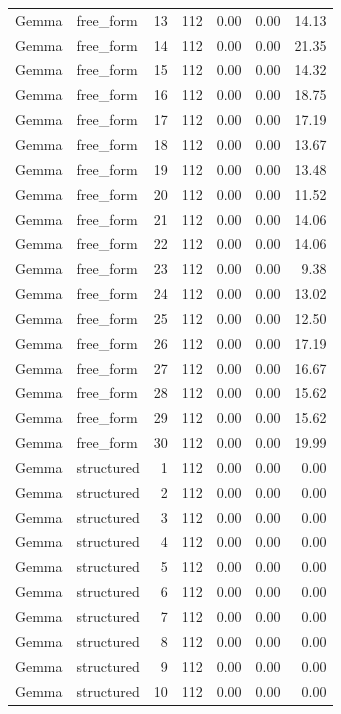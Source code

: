 \begin{longtable}{llrrrrr}
Gemma & free\_form & 13 & 112 & 0.00 & 0.00 & 14.13 \\
Gemma & free\_form & 14 & 112 & 0.00 & 0.00 & 21.35 \\
Gemma & free\_form & 15 & 112 & 0.00 & 0.00 & 14.32 \\
Gemma & free\_form & 16 & 112 & 0.00 & 0.00 & 18.75 \\
Gemma & free\_form & 17 & 112 & 0.00 & 0.00 & 17.19 \\
Gemma & free\_form & 18 & 112 & 0.00 & 0.00 & 13.67 \\
Gemma & free\_form & 19 & 112 & 0.00 & 0.00 & 13.48 \\
Gemma & free\_form & 20 & 112 & 0.00 & 0.00 & 11.52 \\
Gemma & free\_form & 21 & 112 & 0.00 & 0.00 & 14.06 \\
Gemma & free\_form & 22 & 112 & 0.00 & 0.00 & 14.06 \\
Gemma & free\_form & 23 & 112 & 0.00 & 0.00 & 9.38 \\
Gemma & free\_form & 24 & 112 & 0.00 & 0.00 & 13.02 \\
Gemma & free\_form & 25 & 112 & 0.00 & 0.00 & 12.50 \\
Gemma & free\_form & 26 & 112 & 0.00 & 0.00 & 17.19 \\
Gemma & free\_form & 27 & 112 & 0.00 & 0.00 & 16.67 \\
Gemma & free\_form & 28 & 112 & 0.00 & 0.00 & 15.62 \\
Gemma & free\_form & 29 & 112 & 0.00 & 0.00 & 15.62 \\
Gemma & free\_form & 30 & 112 & 0.00 & 0.00 & 19.99 \\
Gemma & structured & 1 & 112 & 0.00 & 0.00 & 0.00 \\
Gemma & structured & 2 & 112 & 0.00 & 0.00 & 0.00 \\
Gemma & structured & 3 & 112 & 0.00 & 0.00 & 0.00 \\
Gemma & structured & 4 & 112 & 0.00 & 0.00 & 0.00 \\
Gemma & structured & 5 & 112 & 0.00 & 0.00 & 0.00 \\
Gemma & structured & 6 & 112 & 0.00 & 0.00 & 0.00 \\
Gemma & structured & 7 & 112 & 0.00 & 0.00 & 0.00 \\
Gemma & structured & 8 & 112 & 0.00 & 0.00 & 0.00 \\
Gemma & structured & 9 & 112 & 0.00 & 0.00 & 0.00 \\
Gemma & structured & 10 & 112 & 0.00 & 0.00 & 0.00 \\

\end{longtable}
